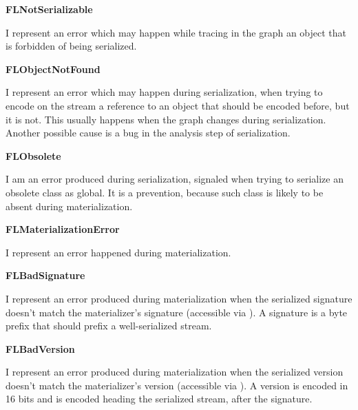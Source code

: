 \documentclass[a4paper,10pt,twoside]{book}
\begin{document}
\begin{list}{}{}
\item\hspace{-\labelwidth}\textbf{ FLNotSerializable}
\item  I represent an error which may happen while tracing in the graph an object that is forbidden of being serialized.
\end{list}

\begin{list}{}{}
\item\hspace{-\labelwidth}\textbf{ FLObjectNotFound}
\item  I represent an error which may happen during serialization, when trying to encode on the stream a reference to an object that should be encoded before, but it is not. This usually happens when the graph changes during serialization. Another possible cause is a bug in the analysis step of serialization.
\end{list}

\begin{list}{}{}
\item\hspace{-\labelwidth}\textbf{ FLObsolete}
\item  I am an error produced during serialization, signaled when trying to serialize an obsolete class as global. It is a prevention, because such class is likely to be absent during materialization.
\end{list}

\begin{list}{}{}
\item\hspace{-\labelwidth}\textbf{ FLMaterializationError}
\item  I represent an error happened during materialization.
\end{list}

\begin{list}{}{}
\item\hspace{-\labelwidth}\textbf{ FLBadSignature}
\item  I represent an error produced during materialization when the serialized signature doesn't match the materializer's signature (accessible via ). A signature is a byte prefix that should prefix a well-serialized stream.
\end{list}

\begin{list}{}{}
\item\hspace{-\labelwidth}\textbf{ FLBadVersion}
\item  I represent an error produced during materialization when the serialized version doesn't match the materializer's version (accessible via ). A version is encoded in 16 bits and is encoded heading the serialized stream, after the signature.
\end{list}
\end{document}
